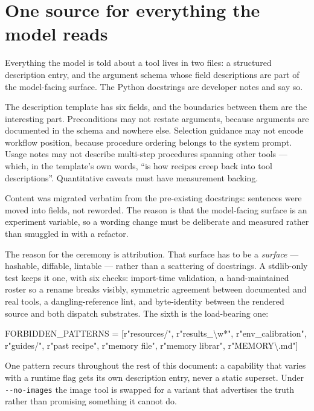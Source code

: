 \documentclass[11pt,a4paper]{report}
\begin{document}
\chapter{One source for everything the model reads}

Everything the model is told about a tool lives in two files: a structured
description entry, and the argument schema whose field descriptions are part of
the model-facing surface. The Python docstrings are developer notes and say so.

The description template has six fields, and the boundaries between them are the
interesting part. Preconditions may not restate arguments, because arguments are
documented in the schema and nowhere else. Selection guidance may not encode
workflow position, because procedure ordering belongs to the system prompt.
Usage notes may not describe multi-step procedures spanning other tools ---
which, in the template's own words, ``is how recipes creep back into tool
descriptions''. Quantitative caveats must have measurement backing.

Content was migrated verbatim from the pre-existing docstrings: sentences were
moved into fields, not reworded. The reason is that the model-facing surface is
an experiment variable, so a wording change must be deliberate and measured
rather than smuggled in with a refactor.

The reason for the ceremony is attribution. That surface has to be a
\emph{surface} --- hashable, diffable, lintable --- rather than a scattering of
docstrings. A stdlib-only test keeps it one, with six checks: import-time
validation, a hand-maintained roster so a rename breaks visibly, symmetric
agreement between documented and real tools, a dangling-reference lint, and
byte-identity between the rendered source and both dispatch substrates. The
sixth is the load-bearing one:

\begin{evidence}[title={The prior-leak lint, run over the rendered bytes the model sees}]
\ttfamily\footnotesize
FORBIDDEN\_PATTERNS = [r"resources/", r"results\_\textbackslash w*", r"env\_calibration",\\
\hspace*{6em} r"guides/", r"past recipe", r"memory file", r"memory librar", r"MEMORY\textbackslash .md"]
\end{evidence}

\noindent
One pattern recurs throughout the rest of this document: a capability that
varies with a runtime flag gets its own description entry, never a static
superset. Under \texttt{-{}-no-images} the image tool is swapped for a variant
that advertises the truth rather than promising something it cannot do.
\end{document}
